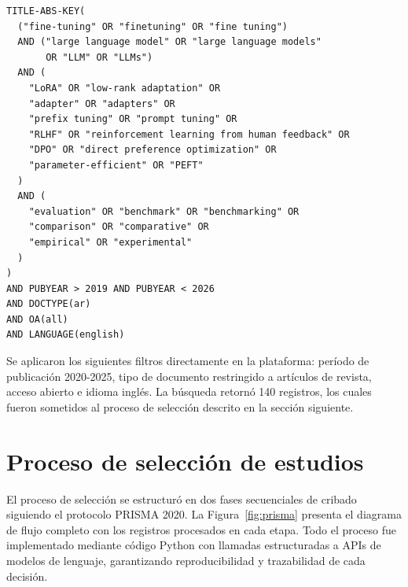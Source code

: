 \begin{lstlisting}[basicstyle=\ttfamily\scriptsize]
TITLE-ABS-KEY(
  ("fine-tuning" OR "finetuning" OR "fine tuning")
  AND ("large language model" OR "large language models"
       OR "LLM" OR "LLMs")
  AND (
    "LoRA" OR "low-rank adaptation" OR
    "adapter" OR "adapters" OR
    "prefix tuning" OR "prompt tuning" OR
    "RLHF" OR "reinforcement learning from human feedback" OR
    "DPO" OR "direct preference optimization" OR
    "parameter-efficient" OR "PEFT"
  )
  AND (
    "evaluation" OR "benchmark" OR "benchmarking" OR
    "comparison" OR "comparative" OR
    "empirical" OR "experimental"
  )
)
AND PUBYEAR > 2019 AND PUBYEAR < 2026
AND DOCTYPE(ar)
AND OA(all)
AND LANGUAGE(english)
\end{lstlisting}

Se aplicaron los siguientes filtros directamente en la plataforma: período de publicación 2020-2025, tipo de documento restringido a artículos de revista, acceso abierto e idioma inglés. La búsqueda retornó 140 registros, los cuales fueron sometidos al proceso de selección descrito en la sección siguiente.
\section{Proceso de selección de estudios}

El proceso de selección se estructuró en dos fases secuenciales de cribado siguiendo el protocolo PRISMA 2020. La Figura~\ref{fig:prisma} presenta el diagrama de flujo completo con los registros procesados en cada etapa. Todo el proceso fue implementado mediante código Python con llamadas estructuradas a APIs de modelos de lenguaje, garantizando reproducibilidad y trazabilidad de cada decisión.

